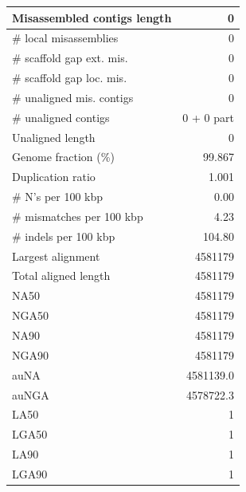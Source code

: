 \documentclass[12pt,a4paper]{article}
\begin{document}
\begin{table}[ht]
\begin{center}
\begin{tabular}{|l*{1}{|r}|}
Misassembled contigs length & 0 \\ \hline
\# local misassemblies & 0 \\ \hline
\# scaffold gap ext. mis. & 0 \\ \hline
\# scaffold gap loc. mis. & 0 \\ \hline
\# unaligned mis. contigs & 0 \\ \hline
\# unaligned contigs & 0 + 0 part \\ \hline
Unaligned length & 0 \\ \hline
Genome fraction (\%) & 99.867 \\ \hline
Duplication ratio & 1.001 \\ \hline
\# N's per 100 kbp & 0.00 \\ \hline
\# mismatches per 100 kbp & 4.23 \\ \hline
\# indels per 100 kbp & 104.80 \\ \hline
Largest alignment & 4581179 \\ \hline
Total aligned length & 4581179 \\ \hline
NA50 & 4581179 \\ \hline
NGA50 & 4581179 \\ \hline
NA90 & 4581179 \\ \hline
NGA90 & 4581179 \\ \hline
auNA & 4581139.0 \\ \hline
auNGA & 4578722.3 \\ \hline
LA50 & 1 \\ \hline
LGA50 & 1 \\ \hline
LA90 & 1 \\ \hline
LGA90 & 1 \\ \hline
\end{tabular}
\end{center}
\end{table}
\end{document}
